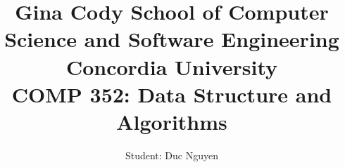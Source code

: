\documentclass[16pt, letterpaper]{article}
\title{Gina Cody School of Computer Science and Software Engineering \\Concordia University
\\COMP 352: Data Structure and Algorithms }
\author{Student: Duc Nguyen}
\date{}
\begin{document}
\begin{titlepage}
\maketitle
\end{titlepage}
\tableofcontents

\end{document}
